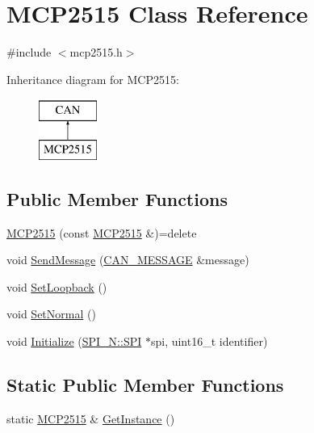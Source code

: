 \hypertarget{class_m_c_p2515}{}\section{M\+C\+P2515 Class Reference}
\label{class_m_c_p2515}


{\ttfamily \#include $<$mcp2515.\+h$>$}

Inheritance diagram for M\+C\+P2515\+:\begin{figure}[H]
\begin{center}
\leavevmode
\includegraphics[height=2.000000cm]{class_m_c_p2515}
\end{center}
\end{figure}
\subsection*{Public Member Functions}
\begin{DoxyCompactItemize}
\item 
\hyperlink{class_m_c_p2515_a8cd4111604b740feb758bd4d077f4fb8}{M\+C\+P2515} (const \hyperlink{class_m_c_p2515}{M\+C\+P2515} \&)=delete
\item 
void \hyperlink{class_m_c_p2515_aa8c9fe944f7e6e99feb3f56a1c099a29}{Send\+Message} (\hyperlink{struct_c_a_n___m_e_s_s_a_g_e}{C\+A\+N\+\_\+\+M\+E\+S\+S\+A\+GE} \&message)
\item 
void \hyperlink{class_m_c_p2515_a7aac5fdb713b83933391348f1188f2b9}{Set\+Loopback} ()
\item 
void \hyperlink{class_m_c_p2515_a58601a9d30863ebac441d641ddfac44e}{Set\+Normal} ()
\item 
void \hyperlink{class_m_c_p2515_a60a93ccc1a0b21caaba5fda5f88117d2}{Initialize} (\hyperlink{class_s_p_i___n_1_1_s_p_i}{S\+P\+I\+\_\+\+N\+::\+S\+PI} $\ast$spi, uint16\+\_\+t identifier)
\end{DoxyCompactItemize}
\subsection*{Static Public Member Functions}
\begin{DoxyCompactItemize}
\item 
static \hyperlink{class_m_c_p2515}{M\+C\+P2515} \& \hyperlink{class_m_c_p2515_a3f53839a9258086fd21e2fc4190de60d}{Get\+Instance} ()
\end{DoxyCompactItemize}
